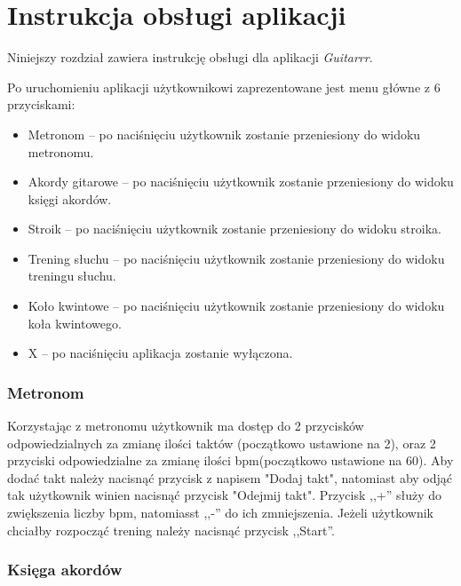 \chapter{Instrukcja obsługi aplikacji}

Niniejszy rozdział zawiera instrukcję obsługi dla aplikacji \emph{Guitarrr}. 

Po uruchomieniu aplikacji użytkownikowi zaprezentowane jest menu główne z 6 przyciskami:

\begin{itemize}
    \item Metronom -- po naciśnięciu użytkownik zostanie przeniesiony do widoku metronomu.
    \item Akordy gitarowe -- po naciśnięciu użytkownik zostanie przeniesiony do widoku księgi akordów.
    \item Stroik -- po naciśnięciu użytkownik zostanie przeniesiony do widoku stroika.
    \item Trening słuchu -- po naciśnięciu użytkownik zostanie przeniesiony do widoku treningu słuchu.
    \item Koło kwintowe -- po naciśnięciu użytkownik zostanie przeniesiony do widoku koła kwintowego.
    \item X -- po naciśnięciu aplikacja zostanie wyłączona.
\end{itemize}

\subsection{Metronom}

Korzystając z metronomu użytkownik ma dostęp do 2 przycisków odpowiedzialnych za zmianę ilości taktów (początkowo ustawione na 2), oraz 2 przyciski odpowiedzialne za zmianę ilości bpm(początkowo ustawione na 60). Aby dodać takt należy nacisnąć przycisk z napisem "Dodaj takt", natomiast aby odjąć tak użytkownik winien nacisnąć przycisk "Odejmij takt". Przycisk ,,+'' służy do zwiększenia liczby bpm, natomiasst ,,-'' do ich zmniejszenia. Jeżeli użytkownik chciałby rozpocząć trening należy nacisnąć przycisk ,,Start''.

\subsection{Księga akordów}

